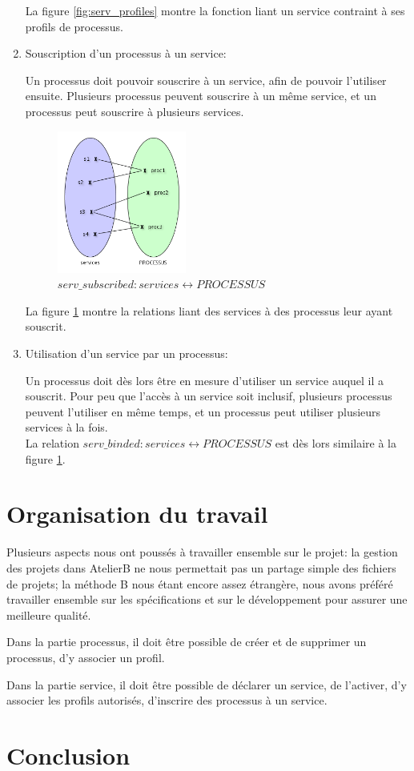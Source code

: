 \documentclass[french, titlepage, 10pt, a4paper]{article}
\begin{document}
\begin{enumerate}
    La figure \ref{fig:serv_profiles} montre la fonction liant un service
    contraint à ses profils de processus.

  \item Souscription d'un processus à un service:

    Un processus doit pouvoir souscrire à un service, afin de pouvoir l'utiliser
    ensuite.
    Plusieurs processus peuvent souscrire à un même service, et un processus
    peut souscrire à plusieurs services.

    \begin{figure}[htb]
      \centering
      \includegraphics[width=0.4\textwidth]{serv_proc.png}
      \caption{$serv\_subscribed: services \leftrightarrow PROCESSUS$}
      \label{fig:serv_subscribed}
    \end{figure}

    La figure \ref{fig:serv_subscribed} montre la relations liant des services
    à des processus leur ayant souscrit.

  \item Utilisation d'un service par un processus:

    Un processus doit dès lors être en mesure d'utiliser un service auquel il a
    souscrit.
    Pour peu que l'accès à un service soit inclusif, plusieurs processus peuvent
    l'utiliser en même temps, et un processus peut utiliser plusieurs services à
    la fois.\\

    La relation $serv\_binded: services \leftrightarrow PROCESSUS$ est
    dès lors similaire à la figure \ref{fig:serv_subscribed}.

\end{enumerate}

\section{Organisation du travail}
Plusieurs aspects nous ont poussés à travailler ensemble sur le projet: la
gestion des projets dans AtelierB ne nous permettait pas un partage simple des
fichiers de projets; la méthode B nous étant encore assez étrangère, nous avons
préféré travailler ensemble sur les spécifications et sur le développement pour
assurer une meilleure qualité.

Dans la partie processus, il doit être possible de créer et de supprimer un
processus, d'y associer un profil.

Dans la partie service, il doit être possible de déclarer un service, de
l'activer, d'y associer les profils autorisés, d'inscrire des processus à un
service.

\section{Conclusion}
\end{document}
